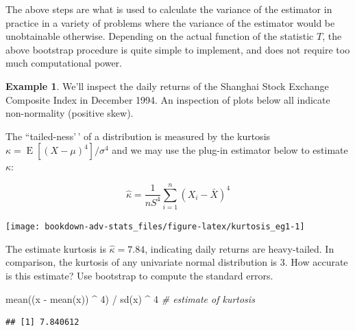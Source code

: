 \documentclass[
]{book}
\newenvironment{Shaded}{\begin{snugshade}}{\end{snugshade}}
\newcommand{\CommentTok}[1]{\textcolor[rgb]{0.56,0.35,0.01}{\textit{#1}}}
\newcommand{\DecValTok}[1]{\textcolor[rgb]{0.00,0.00,0.81}{#1}}
\newcommand{\FunctionTok}[1]{\textcolor[rgb]{0.00,0.00,0.00}{#1}}
\newcommand{\NormalTok}[1]{#1}
\newcommand{\SpecialCharTok}[1]{\textcolor[rgb]{0.00,0.00,0.00}{#1}}
\DeclareMathOperator{\E}{E}
\theoremstyle{definition}
\theoremstyle{definition}
\newtheorem{example}{Example}[chapter]
\theoremstyle{definition}
\theoremstyle{definition}
\theoremstyle{remark}
\begin{document}
The above steps are what is used to calculate the variance of the estimator in practice in a variety of problems where the variance of the estimator would be unobtainable otherwise.
Depending on the actual function of the statistic \(T\), the above bootstrap procedure is quite simple to implement, and does not require too much computational power.

\begin{example}

We'll inspect the daily returns of the Shanghai Stock Exchange Composite Index in December 1994. An inspection of plots below all indicate non-normality (positive skew).

The ``tailed-ness'\,' of a distribution is measured by the kurtosis \(\kappa=\E\left[(X-\mu)^4 \right]/\sigma^4\) and we may use the plug-in estimator below to estimate \(\kappa\):

\[
\hat\kappa = \frac{1}{nS^4} \sum_{i=1}^n (X_i-\bar X)^4 
\]

\begin{center}\texttt{[image: bookdown-adv-stats\_files/figure-latex/kurtosis\_eg1-1]} \end{center}

The estimate kurtosis is \(\hat\kappa=7.84\), indicating daily returns are heavy-tailed. In comparison, the kurtosis of any univariate normal distribution is 3. How accurate is this estimate? Use bootstrap to compute the standard errors.

\begin{Shaded}
\begin{Highlighting}[]
\FunctionTok{mean}\NormalTok{((x }\SpecialCharTok{{-}} \FunctionTok{mean}\NormalTok{(x)) }\SpecialCharTok{\^{}} \DecValTok{4}\NormalTok{) }\SpecialCharTok{/} \FunctionTok{sd}\NormalTok{(x) }\SpecialCharTok{\^{}} \DecValTok{4}  \CommentTok{\# estimate of kurtosis}
\end{Highlighting}
\end{Shaded}

\begin{verbatim}
## [1] 7.840612
\end{verbatim}


\end{example}
\end{document}
